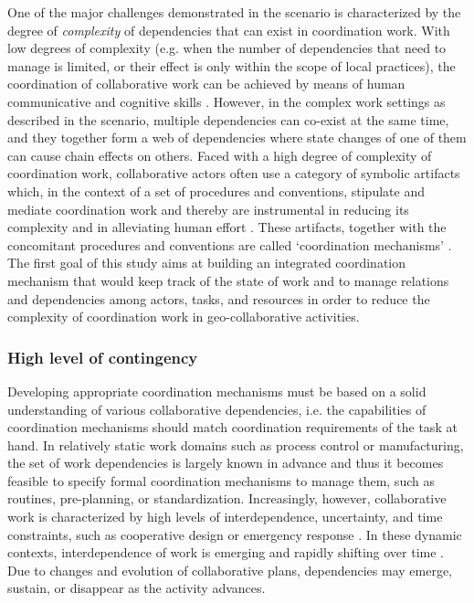 One of the major challenges demonstrated in the scenario is characterized by the degree of \emph{complexity} of dependencies that can exist in coordination work. With low degrees of complexity (e.g. when the number of dependencies that need to manage is limited, or their effect is only within the scope of local practices), the coordination of collaborative work can be achieved by means of human communicative and cognitive skills \cite{schmidt1996a}. However, in the complex work settings as described in the scenario, multiple dependencies can co-exist at the same time, and they together form a web of dependencies where state changes of one of them can cause chain effects on others. Faced with a high degree of complexity of coordination work, collaborative actors often use a category of symbolic artifacts which, in the context of a set of procedures and conventions, stipulate and mediate coordination work and thereby are instrumental in reducing its complexity and in alleviating human effort \cite{simone1995notation}. These artifacts, together with the concomitant procedures and conventions are called `coordination mechanisms' \cite{schmidt1996a}. The first goal of this study aims at building an integrated coordination mechanism that would keep track of the state of work and to manage relations and dependencies among actors, tasks, and resources in order to reduce the complexity of coordination work in geo-collaborative activities.

\subsubsection{High level of contingency} %
\label{ssub:high_level_of_contingency}
Developing appropriate coordination mechanisms must be based on a solid understanding of various collaborative dependencies, i.e. the capabilities of coordination mechanisms should match coordination requirements of the task at hand. In relatively static work domains such as process control or manufacturing, the set of work dependencies is largely known in advance and thus it becomes feasible to specify formal coordination mechanisms to manage them, such as routines, pre-planning, or standardization. Increasingly, however, collaborative work is characterized by high levels of interdependence, uncertainty, and time constraints, such as cooperative design \cite{carstensen1994we} or emergency response \cite{shen2004managing}. In these dynamic contexts, interdependence of work is emerging and rapidly shifting over time \cite{espinosa2004explicit}. Due to changes and evolution of collaborative plans, dependencies may emerge, sustain, or disappear as the activity advances. 

